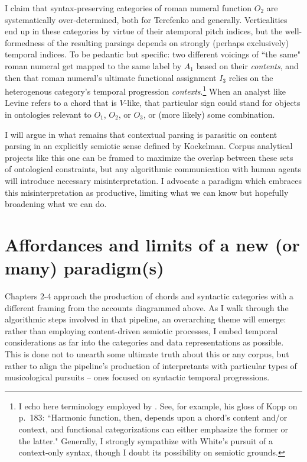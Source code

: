 I claim that syntax-preserving categories of roman numeral function $O_2$ are systematically over-determined, both for Terefenko and generally.  Verticalities end up in these categories by virtue of their atemporal pitch indices, but the well-formedness of the resulting parsings depends on strongly (perhaps exclusively) temporal indices.  To be pedantic but specific: two different voicings of ``the same" roman numeral get mapped to the same label by $A_1$ based on their \emph{contents}, and then that roman numeral's ultimate functional assignment $I_3$ relies on the heterogenous category's temporal progression \emph{contexts}.\footnote{I echo here terminology employed by \cite{white2013}.  See, for example, his gloss of Kopp on p.\ 183: ``Harmonic function, then, depends upon a chord's content and/or context, and functional categorizations can either emphasize the former or the latter."  Generally, I strongly sympathize with White's pursuit of a context-only syntax, though I doubt its possibility on semiotic grounds.}  When an analyst like Levine refers to a chord that is $V$-like, that particular sign could stand for objects in ontologies relevant to $O_1$, $O_2$, or $O_3$, or (more likely) some combination.

I will argue in what remains that contextual parsing is parasitic on content parsing in an explicitly semiotic sense defined by Kockelman.  Corpus analytical projects like this one can be framed to maximize the overlap between these sets of ontological constraints, but any algorithmic communication with human agents will introduce necessary misinterpretation.  I advocate a paradigm which embraces this misinterpretation as productive, limiting what we can know but hopefully broadening what we can do.

\section{Affordances and limits of a new (or many) paradigm(s)}

Chapters 2-4 approach the production of chords and syntactic categories with a different framing from the accounts diagrammed above.  As I walk through the algorithmic steps involved in that pipeline, an overarching theme will emerge: rather than employing content-driven semiotic processes, I embed temporal considerations as far into the categories and data representations as possible.  This is done not to unearth some ultimate truth about this or any corpus, but rather to align the pipeline's production of interpretants with particular types of musicological pursuits -- ones focused on syntactic temporal progressions.  


